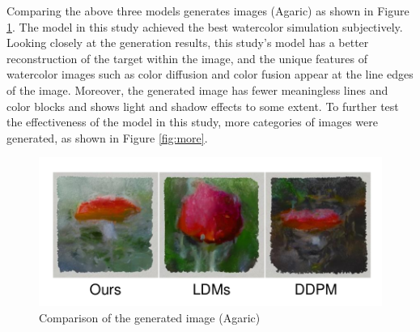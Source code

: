\documentclass[12pt]{report}
\begin{document}
Comparing the above three models generates images (Agaric) as shown in Figure \ref{fig:eva}. The model in this study achieved the best watercolor simulation subjectively. Looking closely at the generation results, this study's model has a better reconstruction of the target within the image, and the unique features of watercolor images such as color diffusion and color fusion appear at the line edges of the image. Moreover, the generated image has fewer meaningless lines and color blocks and shows light and shadow effects to some extent. To further test the effectiveness of the model in this study, more categories of images were generated, as shown in Figure \ref{fig:more}.
\begin{figure}[h]
    \centering
    \includegraphics[width=16cm]{image/eva.pdf}
    \caption{Comparison of the generated image (Agaric)}
    \label{fig:eva}
\end{figure}
\end{document}
